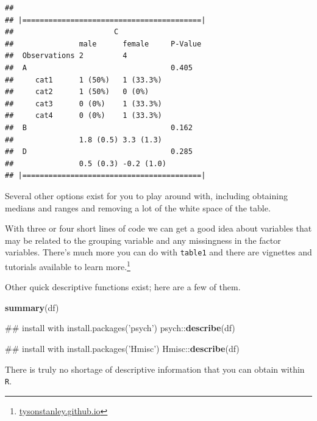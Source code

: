 \documentclass[]{tufte-book}
\newenvironment{Shaded}{}{}
\newcommand{\KeywordTok}[1]{\textcolor[rgb]{0.00,0.44,0.13}{\textbf{#1}}}
\newcommand{\OperatorTok}[1]{\textcolor[rgb]{0.40,0.40,0.40}{#1}}
\newcommand{\NormalTok}[1]{#1}
\theoremstyle{definition}
\theoremstyle{definition}
\theoremstyle{remark}
\begin{document}
\begin{verbatim}
## 
## |=========================================|
##                       C 
##               male      female     P-Value
##  Observations 2         4                 
##  A                                 0.405  
##     cat1      1 (50%)   1 (33.3%)         
##     cat2      1 (50%)   0 (0%)            
##     cat3      0 (0%)    1 (33.3%)         
##     cat4      0 (0%)    1 (33.3%)         
##  B                                 0.162  
##               1.8 (0.5) 3.3 (1.3)         
##  D                                 0.285  
##               0.5 (0.3) -0.2 (1.0)        
## |=========================================|
\end{verbatim}

Several other options exist for you to play around with, including
obtaining medians and ranges and removing a lot of the white space of
the table.

With three or four short lines of code we can get a good idea about
variables that may be related to the grouping variable and any
missingness in the factor variables. There's much more you can do with
\texttt{table1} and there are vignettes and tutorials available to learn
more.\footnote{\url{tysonstanley.github.io}}

Other quick descriptive functions exist; here are a few of them.

\begin{Shaded}
\begin{Highlighting}[]
\KeywordTok{summary}\NormalTok{(df)}
\end{Highlighting}
\end{Shaded}

\begin{Shaded}
\begin{Highlighting}[]
\NormalTok{## install with install.packages('psych')}
\NormalTok{psych}\OperatorTok{::}\KeywordTok{describe}\NormalTok{(df)}
\end{Highlighting}
\end{Shaded}

\begin{Shaded}
\begin{Highlighting}[]
\NormalTok{## install with install.packages('Hmisc')}
\NormalTok{Hmisc}\OperatorTok{::}\KeywordTok{describe}\NormalTok{(df)}
\end{Highlighting}
\end{Shaded}

There is truly no shortage of descriptive information that you can
obtain within \texttt{R}.
\end{document}
